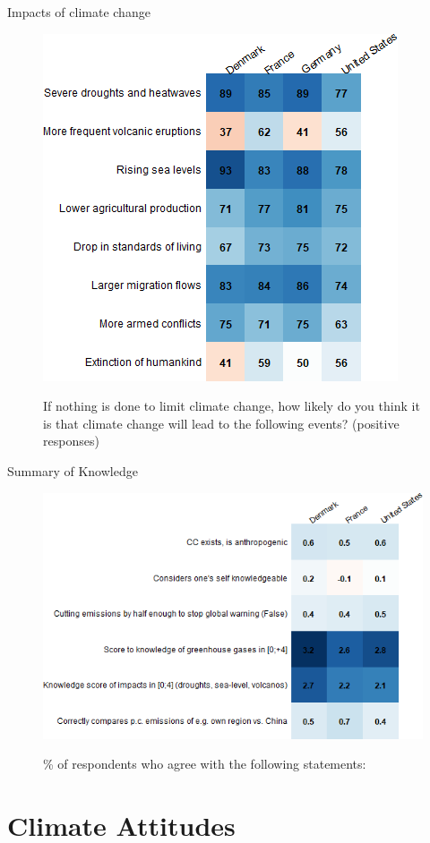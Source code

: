 \documentclass[aspectratio=169,9pt,dvipsnames]{beamer}
\begin{document}
\begin{frame}{Impacts of climate change}%
\begin{figure}[h!]
\centering
\caption{If nothing is done to limit climate change, how likely do you think it is that climate change will lead to the following events? (positive responses)}
\includegraphics[width=.45\textwidth]{../figures/country_comparison/CC_impacts_positive_countries.png} \\
\end{figure}
\end{frame}


\begin{frame}{Summary of Knowledge}%
\begin{figure}[h!]
\centering
\caption{\% of respondents who agree with the following statements:}
\includegraphics[width=.7\textwidth]{../figures/country_comparison/knowledge_wo_footprint_mean_countries.png} \\
\end{figure}
\end{frame}

\section{Climate Attitudes}
\end{document}
